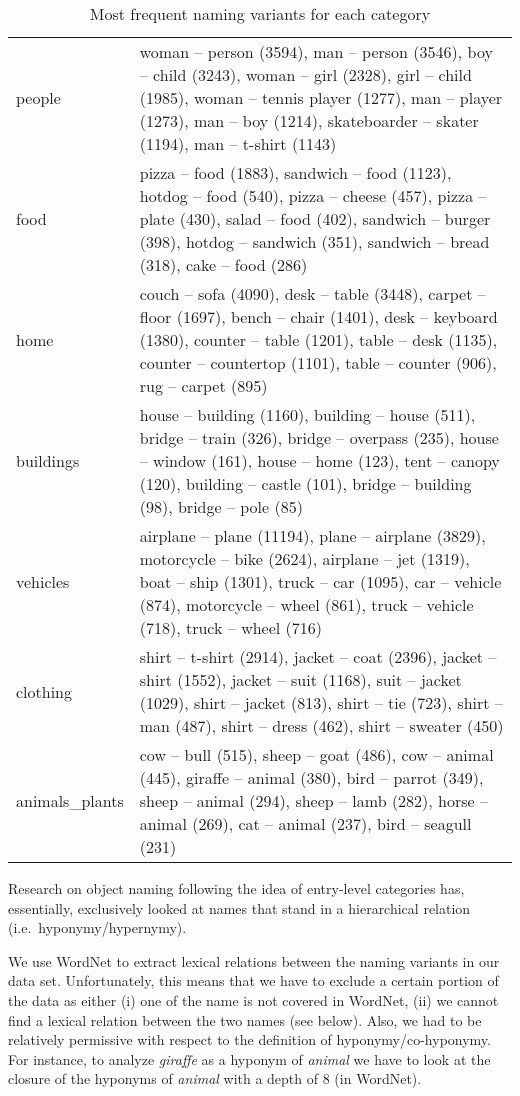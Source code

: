 \begin{table*}
\begin{tabular}{lp{13cm}}
\midrule
 people &  woman -- person (3594), man -- person (3546), boy -- child (3243), woman -- girl (2328), girl -- child (1985), woman -- tennis player (1277), man -- player (1273), man -- boy (1214), skateboarder -- skater (1194), man -- t-shirt (1143) \\
 food &  pizza -- food (1883), sandwich -- food (1123), hotdog -- food (540), pizza -- cheese (457), pizza -- plate (430), salad -- food (402), sandwich -- burger (398), hotdog -- sandwich (351), sandwich -- bread (318), cake -- food (286) \\
 home &  couch -- sofa (4090), desk -- table (3448), carpet -- floor (1697), bench -- chair (1401), desk -- keyboard (1380), counter -- table (1201), table -- desk (1135), counter -- countertop (1101), table -- counter (906), rug -- carpet (895) \\
 buildings &  house -- building (1160), building -- house (511), bridge -- train (326), bridge -- overpass (235), house -- window (161), house -- home (123), tent -- canopy (120), building -- castle (101), bridge -- building (98), bridge -- pole (85) \\
 vehicles &  airplane -- plane (11194), plane -- airplane (3829), motorcycle -- bike (2624), airplane -- jet (1319), boat -- ship (1301), truck -- car (1095), car -- vehicle (874), motorcycle -- wheel (861), truck -- vehicle (718), truck -- wheel (716) \\
 clothing &  shirt -- t-shirt (2914), jacket -- coat (2396), jacket -- shirt (1552), jacket -- suit (1168), suit -- jacket (1029), shirt -- jacket (813), shirt -- tie (723), shirt -- man (487), shirt -- dress (462), shirt -- sweater (450) \\
 animals\_plants &  cow -- bull (515), sheep -- goat (486), cow -- animal (445), giraffe -- animal (380), bird -- parrot (349), sheep -- animal (294), sheep -- lamb (282), horse -- animal (269), cat -- animal (237), bird -- seagull (231) \\
\bottomrule
\end{tabular}\caption{Most frequent naming variants for each category}
\label{tab:exvariants}
\end{table*}

Research on object naming following the idea of entry-level categories has, essentially, exclusively looked at names that stand in a hierarchical relation (i.e.\ hyponymy/hypernymy).

We use WordNet to extract lexical relations between the naming variants in our data set.
Unfortunately, this means that we have to exclude a certain portion of the data as either (i) one of the name is not covered in WordNet, (ii) we cannot find a lexical relation between the two names (see below). Also, we had to be relatively permissive with respect to the definition of hyponymy/co-hyponymy. 
For instance, to analyze \textit{giraffe} as a hyponym of \textit{animal} we have to look at the closure of the hyponyms of \textit{animal} with a depth of 8 (in WordNet).

